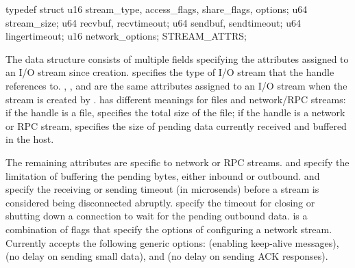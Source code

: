 



\begin{paldef}
typedef struct {
    u16 stream_type, access_flags, share_flags, options;
    u64 stream_size;
    u64 recvbuf, recvtimeout;
    u64 sendbuf, sendtimeout;
    u64 lingertimeout;
    u16 network_options;
} STREAM_ATTRS;
\end{paldef}


The  data structure consists of multiple fields specifying the attributes assigned to an I/O stream since creation.
 specifies the type of I/O stream that the handle references to.
, , and  are the same attributes assigned to an I/O stream when the stream is created by .
 has different meanings for files and network/RPC streams:
if the handle is a file,  specifies the total size of the file;
if the handle is a network or RPC stream,  specifies the size of pending data currently received and buffered in the host.


The remaining attributes are specific to network or RPC streams.
 and  specify the limitation of buffering the pending bytes, either inbound or outbound.
 and  specify the receiving or sending timeout (in microsends)
before a stream is considered being disconnected abruptly.
 specify the timeout for closing or shutting down a connection
to wait for the pending outbound data.
 is a combination of flags that specify the options of configuring a network stream.
Currently  accepts the following generic options:
 (enabling keep-alive messages), %
 (no delay on sending small data),
and  (no delay on sending ACK responses).



